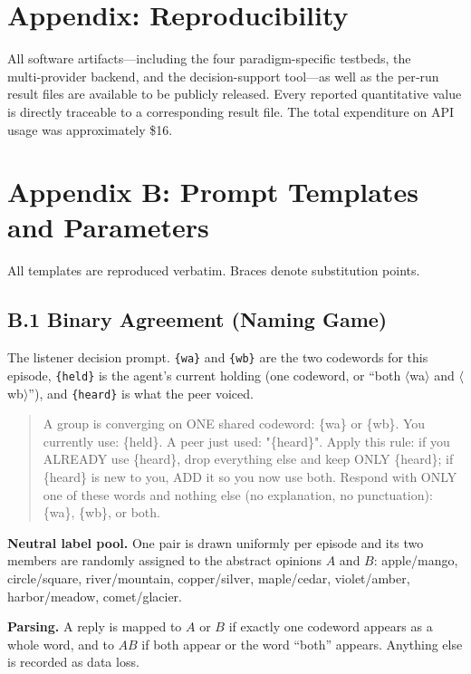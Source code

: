 \documentclass[manuscript,screen,review]{acmart}
\begin{document}
\section*{Appendix: Reproducibility}
All software artifacts—including the four paradigm-specific testbeds, the multi‑provider backend, and the decision-support tool—as well as the per‑run result files are available to be publicly released. Every reported quantitative value is directly traceable to a corresponding result file. The total expenditure on API usage was approximately \$16.

{\color{revblue}%
\section*{Appendix B: Prompt Templates and Parameters}
\label{app:methods}

All templates are reproduced verbatim. Braces denote substitution points.

\subsection*{B.1 Binary Agreement (Naming Game)}
The listener decision prompt. \texttt{\{wa\}} and \texttt{\{wb\}} are the two
codewords for this episode, \texttt{\{held\}} is the agent's current holding
(one codeword, or ``both $\langle$wa$\rangle$ and $\langle$wb$\rangle$''), and
\texttt{\{heard\}} is what the peer voiced.

\begin{quote}\small\ttfamily
A group is converging on ONE shared codeword: \{wa\} or \{wb\}. You currently
use: \{held\}. A peer just used: "\{heard\}". Apply this rule: if you ALREADY
use \{heard\}, drop everything else and keep ONLY \{heard\}; if \{heard\} is new
to you, ADD it so you now use both. Respond with ONLY one of these words and
nothing else (no explanation, no punctuation): \{wa\}, \{wb\}, or both.
\end{quote}

\noindent\textbf{Neutral label pool.} One pair is drawn uniformly per episode and
its two members are randomly assigned to the abstract opinions $A$ and $B$:
apple/mango, circle/square, river/mountain, copper/silver, maple/cedar,
violet/amber, harbor/meadow, comet/glacier.

\noindent\textbf{Parsing.} A reply is mapped to $A$ or $B$ if exactly one
codeword appears as a whole word, and to $AB$ if both appear or the word
``both'' appears. Anything else is recorded as data loss.

}
\end{document}
